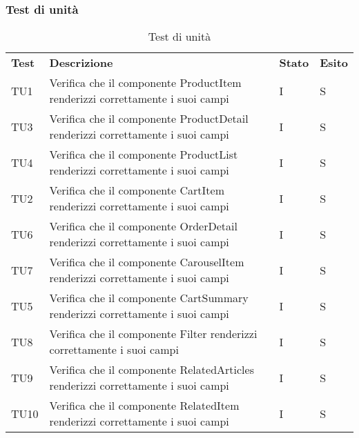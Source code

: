 \subsubsection{Test di unità}
\begin{center}
    \centering
    \renewcommand{\arraystretch}{1.8}
    \label{tab:TestUnita}
    \begin{longtable}[!h]{p{45px} p{255px} p{35px} p{35px}}
        \caption{Test di unità}                                                                                                            \\
        \rowcolor{logo!70}
        \textbf{Test} & \textbf{Descrizione}                                                             & \textbf{Stato} & \textbf{Esito} \\
        TU1           & Verifica che il componente ProductItem renderizzi correttamente i suoi campi     & I              & S              \\
        TU3           & Verifica che il componente ProductDetail renderizzi correttamente i suoi campi   & I              & S              \\
        TU4           & Verifica che il componente ProductList renderizzi correttamente i suoi campi     & I              & S              \\
        TU2           & Verifica che il componente CartItem renderizzi correttamente i suoi campi        & I              & S              \\
        TU6           & Verifica che il componente OrderDetail renderizzi correttamente i suoi campi     & I              & S              \\
        TU7           & Verifica che il componente CarouselItem renderizzi correttamente i suoi campi    & I              & S              \\
        TU5           & Verifica che il componente CartSummary renderizzi correttamente i suoi campi     & I              & S              \\
        TU8           & Verifica che il componente Filter renderizzi correttamente i suoi campi          & I              & S              \\
        TU9           & Verifica che il componente RelatedArticles renderizzi correttamente i suoi campi & I              & S              \\
        TU10          & Verifica che il componente RelatedItem renderizzi correttamente i suoi campi     & I              & S              \\

\end{longtable}
\end{center}
